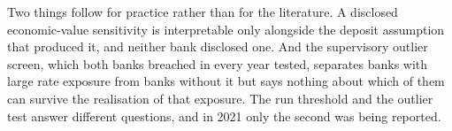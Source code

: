 Two things follow for practice rather than for the literature. A disclosed
economic-value sensitivity is interpretable only alongside the deposit assumption that
produced it, and neither bank disclosed one. And the supervisory outlier screen, which
both banks breached in every year tested, separates banks with large rate exposure
from banks without it but says nothing about which of them can survive the
realisation of that exposure. The run threshold and the outlier test answer different
questions, and in 2021 only the second was being reported.
